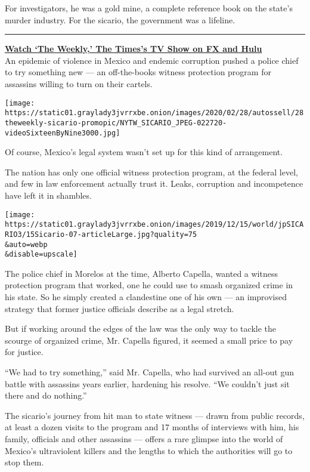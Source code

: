 For investigators, he was a gold mine, a complete reference book on the
state's murder industry. For the sicario, the government was a lifeline.

\begin{center}\rule{0.5\linewidth}{\linethickness}\end{center}

\textbf{\href{https://www.nytimes3xbfgragh.onion/2020/02/28/the-weekly/mexico-cartels-police.html}{Watch
`The Weekly,' The Times's TV Show on FX and Hulu}}\\
An epidemic of violence in Mexico and endemic corruption pushed a police
chief to try something new --- an off-the-books witness protection
program for assassins willing to turn on their cartels.

\texttt{[image: https://static01.graylady3jvrrxbe.onion/images/2020/02/28/autossell/28theweekly-sicario-promopic/NYTW\_SICARIO\_JPEG-022720-videoSixteenByNine3000.jpg]}

Of course, Mexico's legal system wasn't set up for this kind of
arrangement.

The nation has only one official witness protection program, at the
federal level, and few in law enforcement actually trust it. Leaks,
corruption and incompetence have left it in shambles.

\texttt{[image: https://static01.graylady3jvrrxbe.onion/images/2019/12/15/world/jpSICARIO3/15Sicario-07-articleLarge.jpg?quality=75\\\&auto=webp\\\&disable=upscale]}

The police chief in Morelos at the time, Alberto Capella, wanted a
witness protection program that worked, one he could use to smash
organized crime in his state. So he simply created a clandestine one of
his own --- an improvised strategy that former justice officials
describe as a legal stretch.

But if working around the edges of the law was the only way to tackle
the scourge of organized crime, Mr. Capella figured, it seemed a small
price to pay for justice.

``We had to try something,'' said Mr. Capella, who had survived an
all-out gun battle with assassins years earlier, hardening his resolve.
``We couldn't just sit there and do nothing.''

The sicario's journey from hit man to state witness --- drawn from
public records, at least a dozen visits to the program and 17 months of
interviews with him, his family, officials and other assassins ---
offers a rare glimpse into the world of Mexico's ultraviolent killers
and the lengths to which the authorities will go to stop them.


